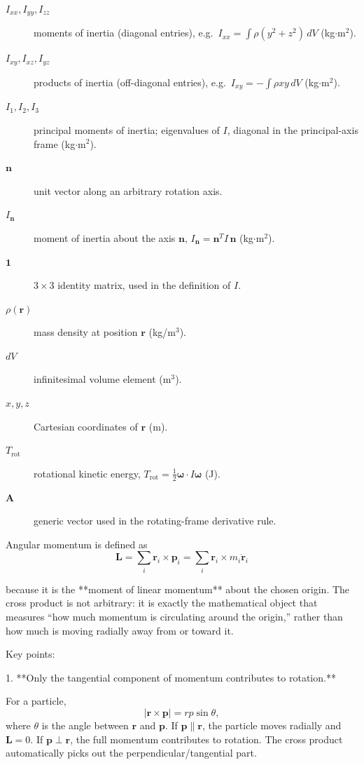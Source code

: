 \documentclass[a4paper,11pt]{article}
\begin{document}
\begin{description}
  \item[\(I_{xx},I_{yy},I_{zz}\)] moments of inertia (diagonal entries), e.g.\ \(I_{xx}=\int\rho(y^2+z^2)\,dV\) (kg\(\cdot\)m\(^2\)).
  \item[\(I_{xy},I_{xz},I_{yz}\)] products of inertia (off-diagonal entries), e.g.\ \(I_{xy}=-\int\rho xy\,dV\) (kg\(\cdot\)m\(^2\)).
  \item[\(I_1,I_2,I_3\)] principal moments of inertia; eigenvalues of \(I\), diagonal in the principal-axis frame (kg\(\cdot\)m\(^2\)).
  \item[\(\mathbf n\)] unit vector along an arbitrary rotation axis.
  \item[\(I_{\mathbf n}\)] moment of inertia about the axis \(\mathbf n\), \(I_{\mathbf n}=\mathbf n^{T}I\,\mathbf n\) (kg\(\cdot\)m\(^2\)).
  \item[\(\mathbf 1\)] \(3\times3\) identity matrix, used in the definition of \(I\).
  \item[\(\rho(\mathbf r)\)] mass density at position \(\mathbf r\) (kg/m\(^3\)).
  \item[\(dV\)] infinitesimal volume element (m\(^3\)).
  \item[\(x,y,z\)] Cartesian coordinates of \(\mathbf r\) (m).
  \item[\(T_{\mathrm{rot}}\)] rotational kinetic energy, \(T_{\mathrm{rot}}=\tfrac12\boldsymbol\omega\cdot I\boldsymbol\omega\) (J).
  \item[\(\mathbf A\)] generic vector used in the rotating-frame derivative rule.
\end{description}

\hrulefill

Angular momentum is defined as
\[
\mathbf L=\sum_i \mathbf r_i\times \mathbf p_i
=\sum_i \mathbf r_i\times m_i\dot{\mathbf r}_i
\]

because it is the **moment of linear momentum** about the chosen origin. The cross product is not arbitrary: it is exactly the mathematical object that measures “how much momentum is circulating around the origin,” rather than how much is moving radially away from or toward it.

Key points:

1. **Only the tangential component of momentum contributes to rotation.**

   For a particle,
   \[
   |\mathbf r\times \mathbf p|=r p\sin\theta,
   \]
   where \(\theta\) is the angle between \(\mathbf r\) and \(\mathbf p\). If \(\mathbf p\parallel \mathbf r\), the particle moves radially and \(\mathbf L=0\). If \(\mathbf p\perp \mathbf r\), the full momentum contributes to rotation. The cross product automatically picks out the perpendicular/tangential part.
\end{document}
